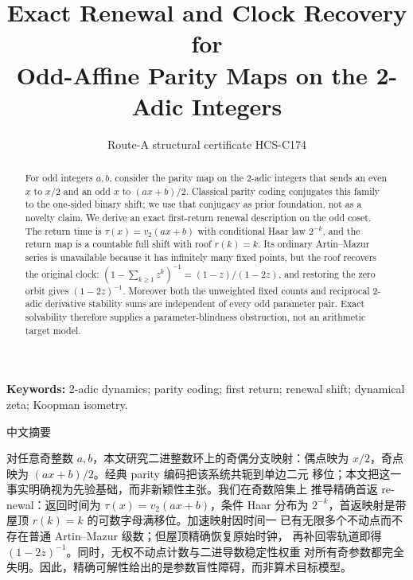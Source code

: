 \documentclass[10pt]{article}
\title{\vspace{-1.5em}Exact Renewal and Clock Recovery for\\Odd-Affine Parity Maps on the 2-Adic Integers}
\author{Route-A structural certificate HCS-C174}
\date{}
\begin{document}
\maketitle
\begin{abstract}
For odd integers $a,b$, consider the parity map on the 2-adic integers that
sends an even $x$ to $x/2$ and an odd $x$ to $(ax+b)/2$.  Classical parity
coding conjugates this family to the one-sided binary shift; we use that
conjugacy as prior foundation, not as a novelty claim.  We derive an exact
first-return renewal description on the odd coset.  The return time is
$\tau(x)=v_2(ax+b)$ with conditional Haar law $2^{-k}$, and the return map is
a countable full shift with roof $r(k)=k$.  Its ordinary Artin--Mazur series
is unavailable because it has infinitely many fixed points, but the roof
recovers the original clock: $(1-\sum_{k\ge1}z^k)^{-1}=(1-z)/(1-2z)$, and
restoring the zero orbit gives $(1-2z)^{-1}$.  Moreover both the unweighted
fixed counts and reciprocal 2-adic derivative stability sums are independent
of every odd parameter pair.  Exact solvability therefore supplies a
parameter-blindness obstruction, not an arithmetic target model.
\end{abstract}
\noindent\textbf{Keywords:} 2-adic dynamics; parity coding; first return;
renewal shift; dynamical zeta; Koopman isometry.

\begin{otherlanguage}{chinese-simplified}
\begin{center}{\large 中文摘要}\end{center}
对任意奇整数 $a,b$，本文研究二进整数环上的奇偶分支映射：偶点映为
$x/2$，奇点映为 $(ax+b)/2$。经典 \foreignlanguage{english}{parity} 编码把该系统共轭到单边二元
移位；本文把这一事实明确视为先验基础，而非新颖性主张。我们在奇数陪集上
推导精确首返 \foreignlanguage{english}{renewal}：返回时间为 $\tau(x)=v_2(ax+b)$，条件 \foreignlanguage{english}{Haar} 分布为
$2^{-k}$，首返映射是带屋顶 $r(k)=k$ 的可数字母满移位。加速映射因时间一
已有无限多个不动点而不存在普通 \foreignlanguage{english}{Artin--Mazur} 级数；但屋顶精确恢复原始时钟，
再补回零轨道即得 $(1-2z)^{-1}$。同时，无权不动点计数与二进导数稳定性权重
对所有奇参数都完全失明。因此，精确可解性给出的是参数盲性障碍，而非算术目标模型。
\end{otherlanguage}
\end{document}
